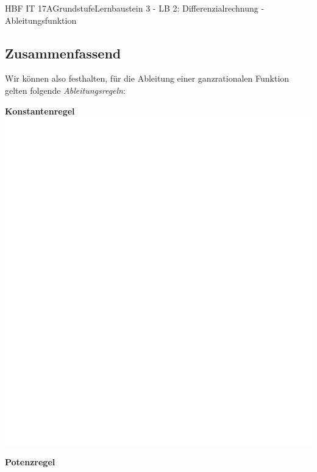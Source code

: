 \documentclass[11pt,twocolumn,oneside,openany,headings=optiontotoc,11pt,numbers=noenddot]{article}
\begin{document}
\begin{worksheet}{HBF IT 17A}{Grundstufe}{Lernbaustein 3 - LB 2: Differenzialrechnung - Ableitungsfunktion}
		\subsection{Zusammenfassend}
		Wir können also festhalten, für die Ableitung einer ganzrationalen Funktion gelten folgende \textit{Ableitungsregeln}:\\
		\par
		\textbf{Konstantenregel}\\
		\includegraphics[scale=0.1]{../empty.jpg}\\
		\par
		\textbf{Potenzregel}\\

\end{worksheet}
\end{document}
